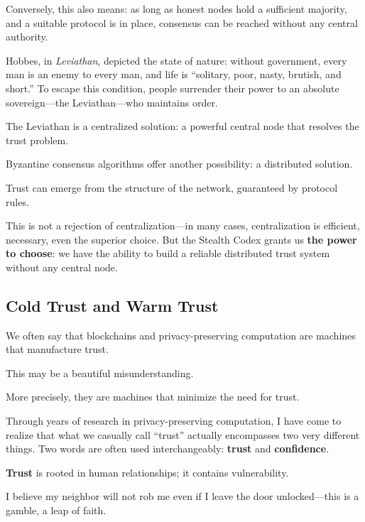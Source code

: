 Conversely, this also means: as long as honest nodes hold a sufficient majority, and a suitable protocol is in place, consensus can be reached without any central authority.

\vspace{1em}

Hobbes, in \textit{Leviathan}, depicted the state of nature: without government, every man is an enemy to every man, and life is ``solitary, poor, nasty, brutish, and short.'' To escape this condition, people surrender their power to an absolute sovereign---the Leviathan---who maintains order.

The Leviathan is a centralized solution: a powerful central node that resolves the trust problem.

Byzantine consensus algorithms offer another possibility: a distributed solution.

\vspace{1em}

Trust can emerge from the structure of the network, guaranteed by protocol rules.

This is not a rejection of centralization---in many cases, centralization is efficient, necessary, even the superior choice. But the Stealth Codex grants us \textbf{the power to choose}: we have the ability to build a reliable distributed trust system without any central node.

\newpage
\subsection{Cold Trust and Warm Trust}

We often say that blockchains and privacy-preserving computation are machines that manufacture trust.

This may be a beautiful misunderstanding.

More precisely, they are machines that minimize the need for trust.

Through years of research in privacy-preserving computation, I have come to realize that what we casually call ``trust'' actually encompasses two very different things. Two words are often used interchangeably: \textbf{trust} and \textbf{confidence}.

\vspace{1em}

\textbf{Trust} is rooted in human relationships; it contains vulnerability.

I believe my neighbor will not rob me even if I leave the door unlocked---this is a gamble, a leap of faith.

